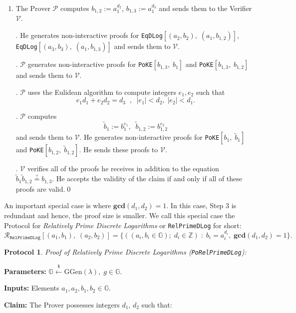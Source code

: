 \documentclass[11pt, lettersize, notitlepage, leqno, footskip=0.6cm]{article}
\newcommand{\bz}{\mathbb Z}
\newcommand{\ttt}{\texttt}
\newcommand{\wti}{\widetilde}
\newcommand{\mc}{\mathcal}
\newcommand{\mb}{\mathbb}
\newcommand{\mbf}{\mathbf}
\newcommand{\mr}{\mathrm}
\newcommand{\lamb}{\lambda}
\newcommand{\V}{\mc{V}}
\newcommand{\vs}{\vspace{-0.15cm}}
\newcommand{\GCD}{\mbf{gcd}}
\newtheorem{Prot}[Thm]{Protocol}
\numberwithin{equation}{section}
\begin{document}
\begin{enumerate}[wide, labelwidth=!, labelindent=0pt]\vs \item The Prover $\mc{P}$ computes $b_{1,2}:= a_1^{d_2}$, $b_{1,3}:= a_1^{d_3}$ and sends them to the Verifier $\V$.

. He generates non-interactive proofs for \verb|EqDLog|$[(a_2, b_2),\; (a_1, b_{1,2})]$, \verb|EqDLog|$[(a_3, b_3),\; (a_1, b_{1,3})]$ and sends them to $\mc{V}$.

. $\mc{P}$ generates non-interactive proofs for \verb|PoKE|$[b_{1,3},\;b_1 ]$ and \verb|PoKE|$[b_{1,3},\;b_{1,2} ]$ and sends them to $\V$.

. $\mc{P}$ uses the Eulidean algorithm to compute integers $e_1, e_2$ such that \vs $$e_1d_1 + e_2d_2 = d_3\;\;,\;\; |e_1| < d_2,\; |e_2| < d_1 .$$

. $\mc{P}$ computes \vs $$\wti{b}_1:= b_1^{e_1},\;\; \wti{b}_{1,2}:= b_{1,2}^{e_2} $$ and sends them to $\V$. He generates non-interactive proofs for \verb|PoKE|$[b_1,\; \wti{b}_1]$ and \verb|PoKE|$[b_{1,2},\; \wti{b}_{1,2}]$. He sends these proofs to $\mc{V}$.

. $\mc{V}$ verifies all of the proofs he receives in addition to the equation $\wti{b}_1\wti{b}_{1,2}\stackrel{?}{=} b_{1,3}$. He accepts the validity of the claim if and only if all of these proofs are valid.\qed \end{enumerate}

\noindent An important special case is where $\GCD(d_1, d_2) = 1$. In this case, Step 3 is redundant and hence, the proof size is smaller. We call this special case the Protocol for \textit{Relatively Prime Discrete Logarithms} or \verb|RelPrimeDLog| for short: $$\mc{R}_{{\ttt{RelPrimeDLog}}}[(a_1,b_1),\;(a_2,b_2)] = \{((a_i, b_i\in\mb{G});\;d_i\in\bz)\;:\; b_i = a_i^{d_i},\;\GCD(d_1,d_2)=1 \} .$$ 



\begin{Prot} \normalfont \textit{Proof of Relatively Prime Discrete Logarithms} (\verb|PoRelPrimeDLog|):\end{Prot} \vspace{-0.3cm}

\noindent \textbf{Parameters:} $\mb{G}\xleftarrow{\$} \mr{GGen}(\lamb), \; g\in \mb{G}$.

\noindent \textbf{Inputs:} Elements $a_1, a_2, b_1, b_2 \in \mb{G}$.

\noindent \textbf{Claim:} The Prover possesses integers $d_1$, $d_2$ such that:
\end{document}
